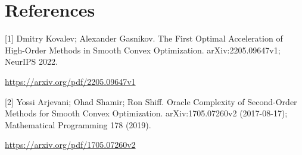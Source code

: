 \documentclass[10pt,a4paper]{article}
\begin{document}
\section{References}
[1] Dmitry Kovalev; Alexander Gasnikov. The First Optimal Acceleration of High-Order Methods in Smooth Convex Optimization. arXiv:2205.09647v1; NeurIPS 2022.

\url{https://arxiv.org/pdf/2205.09647v1}

[2] Yossi Arjevani; Ohad Shamir; Ron Shiff. Oracle Complexity of Second-Order Methods for Smooth Convex Optimization. arXiv:1705.07260v2 (2017-08-17); Mathematical Programming 178 (2019).

\url{https://arxiv.org/pdf/1705.07260v2}
\end{document}
